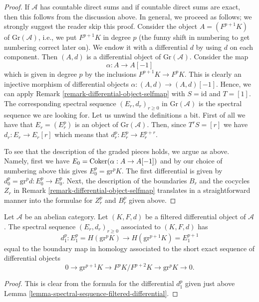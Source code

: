 \begin{proof}
If $\mathcal{A}$ has countable direct sums and if countable direct
sums are exact, then this follows from the discussion above.
In general, we proceed as follows; we strongly suggest the reader
skip this proof. Consider the object $A = (F^{p + 1}K)$ of
$\text{Gr}(\mathcal{A})$, i.e., we put $F^{p + 1}K$ in degree $p$
(the funny shift in numbering to get numbering correct later on).
We endow it with a differential $d$ by using $d$ on each component.
Then $(A, d)$ is a differential object of $\text{Gr}(\mathcal{A})$.
Consider the map
$$
\alpha : A \to A[-1]
$$
which is given in degree $p$ by the inclusions $F^{p + 1}K \to F^pK$.
This is clearly an injective morphism of differential objects
$\alpha : (A, d) \to (A, d)[-1]$. Hence, we can apply
Remark \ref{remark-differential-object-selfmap}
with $S = \text{id}$ and $T = [1]$.
The corresponding spectral sequence $(E_r, d_r)_{r \geq 0}$
in $\text{Gr}(\mathcal{A})$ is the spectral sequence we are looking
for. Let us unwind the definitions a bit.
First of all we have that $E_r = (E_r^p)$ is an object of $\text{Gr}(\mathcal{A})$.
Then, since $T^rS = [r]$ we have $d_r : E_r \to E_r[r]$ which means that
$d_r^p : E_r^p \to E_r^{p + r}$.

\medskip\noindent
To see that the description of the graded pieces holds, we argue
as above. Namely, first we have $E_0 = \mathop{\mathrm{Coker}}(\alpha : A \to A[-1])$
and by our choice of numbering above this gives
$E_0^p = \text{gr}^pK$. The first differential is given by
$d_0^p = \text{gr}^pd : E_0^p \to E_0^p$.
Next, the description of the boundaries $B_r$ and the cocycles $Z_r$
in Remark \ref{remark-differential-object-selfmap}
translates in a straightforward manner into the formulae
for $Z_r^p$ and $B_r^p$ given above.
\end{proof}

\begin{lemma}
\label{lemma-spectral-sequence-filtered-differential-d1}
Let $\mathcal{A}$ be an abelian category. Let $(K, F, d)$ be a filtered
differential object of $\mathcal{A}$. The spectral sequence
$(E_r, d_r)_{r \geq 0}$ associated to $(K, F, d)$ has
$$
d_1^p :
E_1^p = H(\text{gr}^pK)
\longrightarrow
H(\text{gr}^{p + 1}K) = E_1^{p + 1}
$$
equal to the boundary map in homology associated to the short
exact sequence of differential objects
$$
0 \to \text{gr}^{p + 1}K \to F^pK/F^{p + 2}K \to \text{gr}^pK \to 0.
$$
\end{lemma}

\begin{proof}
This is clear from the formula for the differential $d_1^p$
given just above Lemma \ref{lemma-spectral-sequence-filtered-differential}.
\end{proof}

